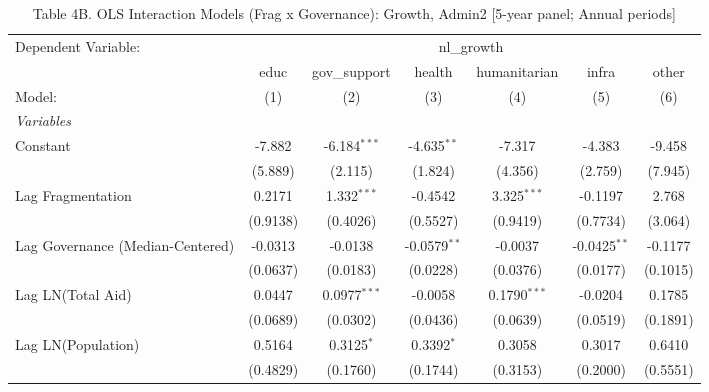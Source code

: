 
\begin{table}[H]
   \caption{Table 4B. OLS Interaction Models (Frag x Governance): Growth, Admin2 [5-year panel; Annual periods]}
   \centering
   \begin{tabular}{lcccccc}
      \tabularnewline \midrule \midrule
      Dependent Variable: & \multicolumn{6}{c}{nl\_growth}\\
                                                           & educ     & gov\_support   & health         & humanitarian   & infra          & other \\   
      Model:                                               & (1)      & (2)            & (3)            & (4)            & (5)            & (6)\\  
      \midrule
      \emph{Variables}\\
      Constant                                             & -7.882   & -6.184$^{***}$ & -4.635$^{**}$  & -7.317         & -4.383         & -9.458\\   
                                                           & (5.889)  & (2.115)        & (1.824)        & (4.356)        & (2.759)        & (7.945)\\   
      Lag Fragmentation                                    & 0.2171   & 1.332$^{***}$  & -0.4542        & 3.325$^{***}$  & -0.1197        & 2.768\\   
                                                           & (0.9138) & (0.4026)       & (0.5527)       & (0.9419)       & (0.7734)       & (3.064)\\   
      Lag Governance (Median-Centered)                     & -0.0313  & -0.0138        & -0.0579$^{**}$ & -0.0037        & -0.0425$^{**}$ & -0.1177\\   
                                                           & (0.0637) & (0.0183)       & (0.0228)       & (0.0376)       & (0.0177)       & (0.1015)\\   
      Lag LN(Total Aid)                                    & 0.0447   & 0.0977$^{***}$ & -0.0058        & 0.1790$^{***}$ & -0.0204        & 0.1785\\   
                                                           & (0.0689) & (0.0302)       & (0.0436)       & (0.0639)       & (0.0519)       & (0.1891)\\   
      Lag LN(Population)                                   & 0.5164   & 0.3125$^{*}$   & 0.3392$^{*}$   & 0.3058         & 0.3017         & 0.6410\\   
                                                           & (0.4829) & (0.1760)       & (0.1744)       & (0.3153)       & (0.2000)       & (0.5551)\\   

\end{tabular}
\end{table}

